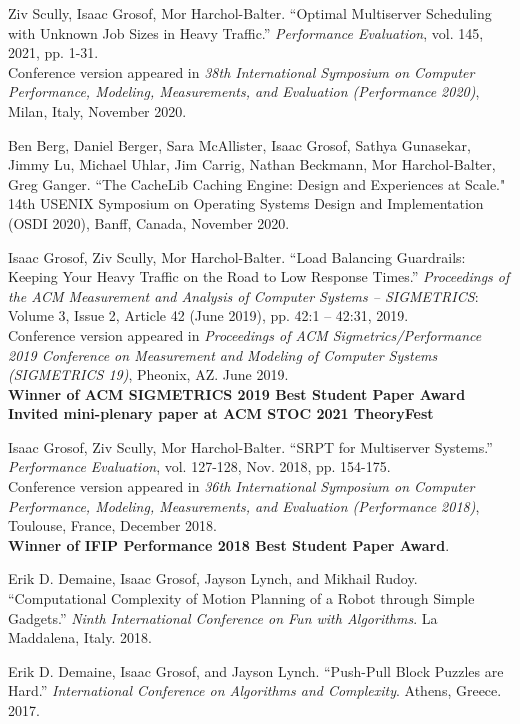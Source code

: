 \documentclass{res}
\begin{document}
\begin{resume}
    Ziv Scully, Isaac Grosof, Mor Harchol-Balter.
    ``Optimal Multiserver Scheduling with Unknown Job Sizes in Heavy Traffic.''
    \textit{Performance Evaluation}, vol. 145, 2021, pp. 1-31. \\
    Conference version appeared in
    \textit{38th International Symposium on Computer Performance, Modeling, Measurements, and Evaluation (Performance 2020)},
    Milan, Italy, November 2020.

	Ben Berg, Daniel Berger, Sara McAllister, Isaac Grosof, Sathya Gunasekar, Jimmy Lu, Michael Uhlar,
	Jim Carrig, Nathan Beckmann, Mor Harchol-Balter, Greg Ganger.
	``The CacheLib Caching Engine: Design and Experiences at Scale."
	14th USENIX Symposium on Operating Systems Design and Implementation (OSDI 2020),
	Banff, Canada, November 2020.

    Isaac Grosof, Ziv Scully, Mor Harchol-Balter.
    ``Load Balancing Guardrails: Keeping Your Heavy Traffic on the Road to Low Response Times.''
    \textit{Proceedings of the ACM Measurement and Analysis of Computer Systems -- SIGMETRICS}:
    Volume 3, Issue 2, Article 42 (June 2019), pp. 42:1 -- 42:31, 2019. \\
    Conference version appeared in \textit{Proceedings of ACM Sigmetrics/Performance 2019
    Conference on Measurement and Modeling of Computer Systems (SIGMETRICS 19)}, Pheonix, AZ.
    June 2019.\\
    \textbf{Winner of ACM SIGMETRICS 2019 Best Student Paper Award} \\
    \textbf{Invited mini-plenary paper at ACM STOC 2021 TheoryFest}

    Isaac Grosof, Ziv Scully, Mor Harchol-Balter.
    ``SRPT for Multiserver Systems.''
    \textit{Performance Evaluation}, vol. 127-128, Nov. 2018, pp. 154-175. \\
    Conference version appeared in \textit{36th International Symposium on Computer Performance, Modeling, Measurements, and Evaluation (Performance 2018)}, Toulouse, France, December 2018. \\
    \textbf{Winner of IFIP Performance 2018 Best Student Paper Award}.

    Erik D. Demaine, Isaac Grosof, Jayson Lynch, and Mikhail Rudoy.
    ``Computational Complexity of Motion Planning of a Robot through Simple Gadgets.''
    \textit{Ninth International Conference on Fun with Algorithms}. La Maddalena, Italy. 2018.

    Erik D. Demaine, Isaac Grosof, and Jayson Lynch.
    ``Push-Pull Block Puzzles are Hard.''
    \textit{International Conference on Algorithms and Complexity}. Athens, Greece. 2017.


\end{resume}
\end{document}
